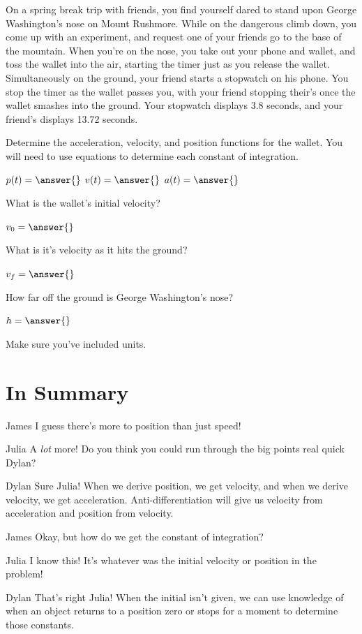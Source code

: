 \documentclass{ximera}
\begin{document}
\begin{question}
On a spring break trip with friends, you find yourself dared to stand upon George Washington's nose on Mount Rushmore. While on the dangerous climb down, you come up with an experiment, and request one of your friends go to the base of the mountain. When you're on the nose, you take out your phone and wallet, and toss the wallet into the air, starting the timer just as you release the wallet. Simultaneously on the ground, your friend starts a stopwatch on his phone. You stop the timer as the wallet passes you, with your friend stopping their's once the wallet smashes into the ground. Your stopwatch displays 3.8 seconds, and your friend's displays 13.72 seconds.

Determine the acceleration, velocity, and position functions for the wallet. You will need to use equations to determine each constant of integration.

$p(t) = \answer{}$
$v(t) = \answer{}$
$a(t) = \answer{}$

What is the wallet's initial velocity?

$v_0 = \answer{}$

What is it's velocity as it hits the ground?

$v_f = \answer{}$

How far off the ground is George Washington's nose?

$h = \answer{}$
\begin{feedback}
Make sure you've included units.
\end{feedback}
\end{question}

\section{In Summary}
\begin{dialogue}
\item[James] I guess there's more to position than just speed!
\item[Julia] A \textit{lot} more! Do you think you could run through the big points real quick Dylan?
\item[Dylan] Sure Julia! When we derive position, we get velocity, and when we derive velocity, we get acceleration. Anti-differentiation will give us velocity from acceleration and position from velocity.
\item[James] Okay, but how do we get the constant of integration?
\item[Julia] I know this! It's whatever was the initial velocity or position in the problem!
\item[Dylan] That's right Julia! When the initial isn't given, we can use knowledge of when an object returns to a position zero or stops for a moment to determine those constants.
\end{dialogue}
\end{document}
